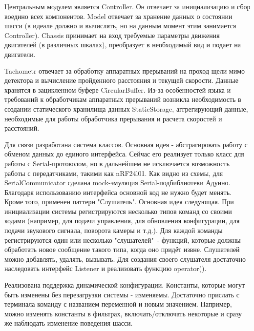 \documentclass[14pt,a4paper,russian]{scrartcl}
\begin{document}
Центральным модулем является Controller. Он отвечает за инициализацию
и сбор воедино всех компонентов. Model отвечает за хранение данных о состоянии
шасси (в идеале должно и вычислять, но на данным момент этим занимается Controller).
Chassis принимает на вход требуемые параметры движения двигателей (в 
различных шкалах), преобразует в необходимый вид и подает на двигатели.

Tachometr отвечает за обработку аппаратных прерываний на проход щели мимо детектора
и вычисление пройденного расстояния и текущей скорости. Данные хранятся в зацикленном
буфере CircularBuffer. Из-за особенностей языка и требований к обработчикам аппаратных
прерываний возникла необходимость в создании статического хранилища данных
StaticStorage, аггрегирующий данные, необходимые для работы обработчика прерывания
и расчета скоростей и расстояний.

Для связи разработана система классов. Основная идея - абстрагировать
работу с обменом данных до единого интерфейса. Сейчас его 
реализует только класс для работы с Serial-протоколом, но в дальнейшем
не исключается возможность работы с передатчиками, такими как nRF24l01. 
Как видно из схемы, для SerialCommunicator сделана mock-эмуляция 
Serial-подбиблиотеки Адуино. Благодаря
использованию интерфейса основной код не нужно будет менять. 
Кроме того, применен паттерн "Слушатель". Основная идея следующая. При
инициализации системы регистрируются несколько типов команд со своими кодами 
(например, для подачи управления, для обновления конфигурации, для
подачи звукового сигнала, поворота камеры и т.д.). Для каждой команды
регистрируются один или несколько "слушателей"\  - функций, которые должны
обработать новое сообщение такого типа, когда оно придёт извне. Слушателей
можно добавлять, удалять, вызывать. Для создания своего слушателя достаточно
наследовать интерфейс Listener и реализовать функцию operator(). 

Реализована поддержка динамической конфигурации. Константы, которые могут
быть изменены без перезагрузки системы - изменяемы. Достаточно прислать
с терминала команду с названием переменной и новым значением. Например,
можно изменять константы в фильтрах, включать/отключать некоторые и сразу же
наблюдать изменение поведения шасси.
\end{document}
